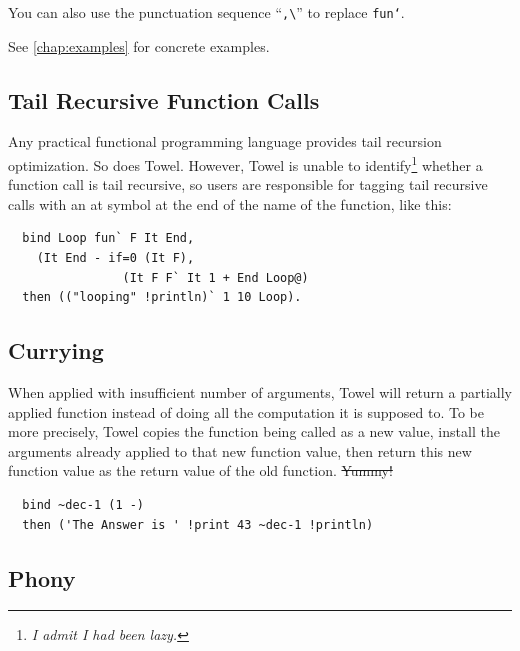\documentclass{report}
\begin{document}
\begin{mdframed}[style=hint]
  You can also use the punctuation sequence ``\texttt{,\textbackslash}'' to replace \texttt{fun`}.
\end{mdframed}

See \autoref{chap:examples} for concrete examples.

\subsection{Tail Recursive Function Calls}

Any practical functional programming language provides tail recursion optimization. So does Towel. However, Towel is unable to identify\footnote{\textit{I admit I had been lazy.}} whether a function call is tail recursive, so users are responsible for tagging tail recursive calls with an at symbol at the end of the name of the function, like this:

\begin{mdframed}[style=example]
\begin{verbatim}
  bind Loop fun` F It End,
    (It End - if=0 (It F),
                (It F F` It 1 + End Loop@)
  then (("looping" !println)` 1 10 Loop).
\end{verbatim}
\end{mdframed}

\subsection{Currying}

When applied with insufficient number of arguments, Towel will return a partially applied function instead of doing all the computation it is supposed to. To be more precisely, Towel copies the function being called as a new value, install the arguments already applied to that new function value, then return this new function value as the return value of the old function. \sout{Yummy!}

\begin{mdframed}[style=example]
\begin{verbatim}
  bind ~dec-1 (1 -)
  then ('The Answer is ' !print 43 ~dec-1 !println)
\end{verbatim}
\end{mdframed}

\subsection{Phony}
\end{document}
